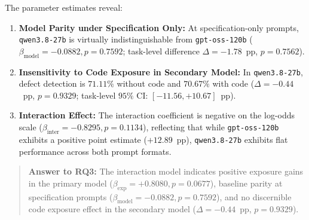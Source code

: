 \documentclass[11pt,a4paper]{article}
\begin{document}
\begin{table}[ht]
\centering
\caption{Parameter Estimates for $2 \times 2$ Factorial Logistic Interaction Model with Cluster-Robust Inference under AST-Scoped Clean Harness ($N=900$, $G=15$ Clusters, $\text{df}=14$).}
\label{tab:logistic_clean}
\end{table}

The parameter estimates reveal:
\begin{enumerate}
    \item \textbf{Model Parity under Specification Only:} At specification-only prompts, \texttt{qwen3.8-27b} is virtually indistinguishable from \texttt{gpt-oss-120b} ($\beta_{\text{model}} = -0.0882, p = 0.7592$; task-level difference $\Delta = -1.78$~pp, $p = 0.7562$).
    \item \textbf{Insensitivity to Code Exposure in Secondary Model:} In \texttt{qwen3.8-27b}, defect detection is $71.11\%$ without code and $70.67\%$ with code ($\Delta = -0.44$~pp, $p = 0.9329$; task-level $95\%$ CI: $[-11.56, +10.67]$~pp).
    \item \textbf{Interaction Effect:} The interaction coefficient is negative on the log-odds scale ($\beta_{\text{inter}} = -0.8295, p = 0.1134$), reflecting that while \texttt{gpt-oss-120b} exhibits a positive point estimate ($+12.89$~pp), \texttt{qwen3.8-27b} exhibits flat performance across both prompt formats.
\end{enumerate}

\begin{quote}
\textbf{Answer to RQ3:} The interaction model indicates positive exposure gains in the primary model ($\beta_{\text{exp}} = +0.8080, p = 0.0677$), baseline parity at specification prompts ($\beta_{\text{model}} = -0.0882, p = 0.7592$), and no discernible code exposure effect in the secondary model ($\Delta = -0.44$~pp, $p = 0.9329$).
\end{quote}
\end{document}
